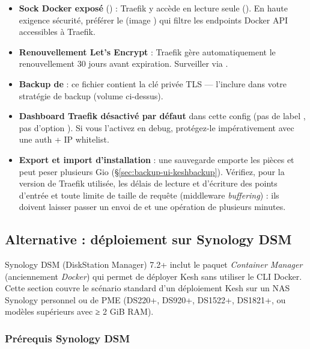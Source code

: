 \documentclass[a4paper,11pt,oneside]{article}
\begin{document}
\begin{itemize}
    \item \textbf{Sock Docker exposé} () : Traefik y accède en lecture seule (). En haute exigence sécurité, préférer le  (image ) qui filtre les endpoints Docker API accessibles à Traefik.
    \item \textbf{Renouvellement Let's Encrypt} : Traefik gère automatiquement le renouvellement 30 jours avant expiration. Surveiller via .
    \item \textbf{Backup de } : ce fichier contient la clé privée TLS — l'inclure dans votre stratégie de backup (volume  ci-dessus).
    \item \textbf{Dashboard Traefik désactivé par défaut} dans cette config (pas de label , pas d'option ). Si vous l'activez en debug, protégez-le impérativement avec une auth + IP whitelist.
    \item \textbf{Export et import d'installation} : une sauvegarde  emporte les pièces et peut peser plusieurs Gio (\S\ref{sec:backup-ui-keshbackup}). Vérifiez, pour la version de Traefik utilisée, les délais de lecture et d'écriture des points d'entrée et toute limite de taille de requête (middleware \emph{buffering}) : ils doivent laisser passer un envoi de  et une opération de plusieurs minutes.
\end{itemize}

\subsection{Alternative : déploiement sur Synology DSM}\label{sec:synology}
\sloppy %

Synology DSM (DiskStation Manager) 7.2+ inclut le paquet \emph{Container Manager} (anciennement \emph{Docker}) qui permet de déployer Kesh sans utiliser le CLI Docker. Cette section couvre le scénario standard d'un déploiement Kesh sur un NAS Synology personnel ou de PME (DS220+, DS920+, DS1522+, DS1821+, ou modèles supérieurs avec ≥ 2 GiB RAM).

\subsubsection{Prérequis Synology DSM}
\end{document}
